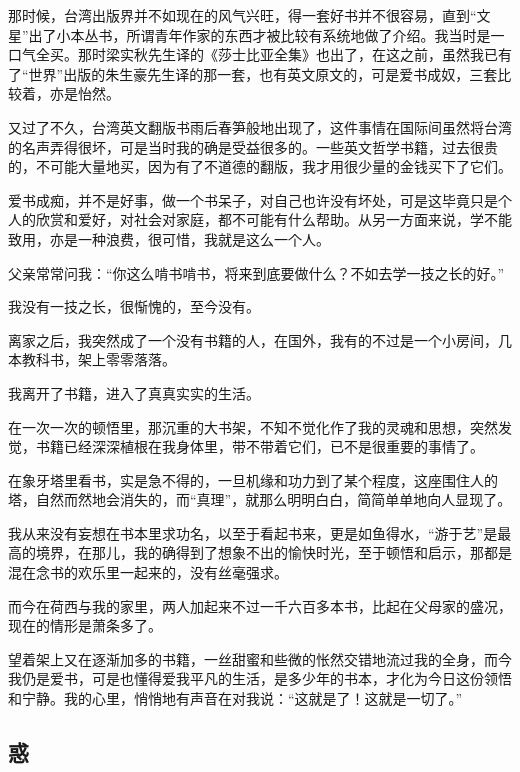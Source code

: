 \par 那时候，台湾出版界并不如现在的风气兴旺，得一套好书并不很容易，直到“文星”出了小本丛书，所谓青年作家的东西才被比较有系统地做了介绍。我当时是一口气全买。那时梁实秋先生译的《莎士比亚全集》也出了，在这之前，虽然我已有了“世界”出版的朱生豪先生译的那一套，也有英文原文的，可是爱书成奴，三套比较着，亦是怡然。
\par 又过了不久，台湾英文翻版书雨后春笋般地出现了，这件事情在国际间虽然将台湾的名声弄得很坏，可是当时我的确是受益很多的。一些英文哲学书籍，过去很贵的，不可能大量地买，因为有了不道德的翻版，我才用很少量的金钱买下了它们。
\par 爱书成痴，并不是好事，做一个书呆子，对自己也许没有坏处，可是这毕竟只是个人的欣赏和爱好，对社会对家庭，都不可能有什么帮助。从另一方面来说，学不能致用，亦是一种浪费，很可惜，我就是这么一个人。
\par 父亲常常问我：“你这么啃书啃书，将来到底要做什么？不如去学一技之长的好。”
\par 我没有一技之长，很惭愧的，至今没有。
\par 离家之后，我突然成了一个没有书籍的人，在国外，我有的不过是一个小房间，几本教科书，架上零零落落。
\par 我离开了书籍，进入了真真实实的生活。
\par 在一次一次的顿悟里，那沉重的大书架，不知不觉化作了我的灵魂和思想，突然发觉，书籍已经深深植根在我身体里，带不带着它们，已不是很重要的事情了。
\par 在象牙塔里看书，实是急不得的，一旦机缘和功力到了某个程度，这座围住人的塔，自然而然地会消失的，而“真理”，就那么明明白白，简简单单地向人显现了。
\par 我从来没有妄想在书本里求功名，以至于看起书来，更是如鱼得水，“游于艺”是最高的境界，在那儿，我的确得到了想象不出的愉快时光，至于顿悟和启示，那都是混在念书的欢乐里一起来的，没有丝毫强求。
\par 而今在荷西与我的家里，两人加起来不过一千六百多本书，比起在父母家的盛况，现在的情形是萧条多了。
\par 望着架上又在逐渐加多的书籍，一丝甜蜜和些微的怅然交错地流过我的全身，而今我仍是爱书，可是也懂得爱我平凡的生活，是多少年的书本，才化为今日这份领悟和宁静。我的心里，悄悄地有声音在对我说：“这就是了！这就是一切了。”


\subsection{惑}


